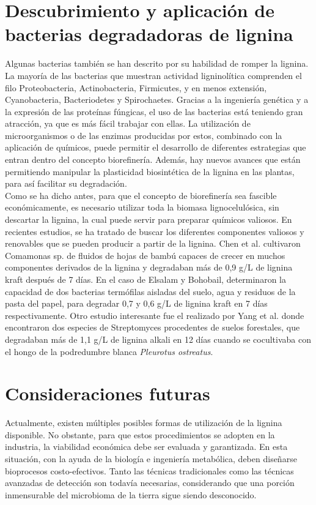 \documentclass[final,a4paper,times,3p,onecolumn]{elsarticle}
\begin{document}
\section{Descubrimiento y aplicación de bacterias degradadoras de lignina}
Algunas bacterias también se han descrito por su habilidad de romper la lignina. La mayoría de las bacterias que muestran actividad ligninolítica comprenden el filo Proteobacteria, Actinobacteria, Firmicutes, y en menos extensión, Cyanobacteria, Bacteriodetes y Spirochaetes. Gracias a la ingeniería genética y a la expresión de las proteínas fúngicas, el uso de las bacterias está teniendo gran atracción, ya que es más fácil trabajar con ellas. La utilización de microorganismos o de las enzimas producidas por estos, combinado con la aplicación de químicos, puede permitir el desarrollo de diferentes estrategias que entran dentro del concepto biorefinería. Además, hay nuevos avances que están permitiendo manipular la plasticidad biosintética de la lignina en las plantas, para así facilitar su degradación. \\

Como se ha dicho antes, para que el concepto de biorefinería sea fascible económicamente, es necesario utilizar toda la biomasa lignocelulósica, sin descartar la lignina, la cual puede servir para preparar químicos valiosos. En recientes estudios, se ha tratado de buscar los diferentes componentes valiosos y renovables que se pueden producir a partir de la lignina.
Chen et al. cultivaron Comamonas sp. de fluidos de hojas de bambú capaces de crecer en muchos componentes derivados de la lignina y degradaban más de 0,9 g/L de lignina kraft después de 7 días. En el caso de Elsalam y Bohobail, determinaron la capacidad de dos bacterias termófilas aisladas del suelo, agua y residuos de la pasta del papel, para degradar 0,7 y 0,6 g/L de lignina kraft en 7 días respectivamente. Otro estudio interesante fue el realizado por Yang et al. donde encontraron dos especies de Streptomyces procedentes de suelos forestales, que degradaban más de 1,1 g/L de lignina alkali en 12 días cuando se cocultivaba con el hongo de la podredumbre blanca \textit{Pleurotus ostreatus}. 

\section{Consideraciones futuras}
Actualmente, existen múltiples posibles formas de utilización de la lignina disponible. No obstante, para que estos procedimientos se adopten en  la industria, la viabilidad económica debe ser evaluada y garantizada. En esta situación, con la ayuda de la biología e ingeniería metabólica, deben diseñarse bioprocesos costo-efectivos. Tanto las técnicas tradicionales como las técnicas avanzadas de detección son todavía necesarias, considerando que una porción inmensurable del microbioma de la tierra sigue siendo desconocido.
\end{document}
